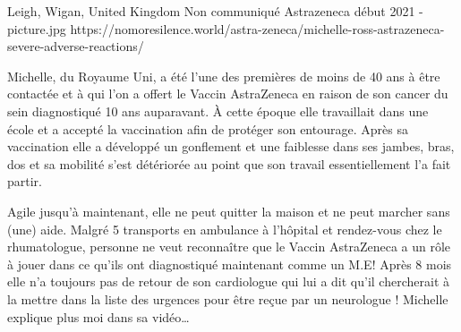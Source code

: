 {Leigh, Wigan, United Kingdom}
{Non communiqué}
{Astrazeneca}
{début 2021}
{-}
{picture.jpg}
{https://nomoresilence.world/astra-zeneca/michelle-ross-astrazeneca-severe-adverse-reactions/}
{

Michelle, du Royaume Uni, a été l’une des premières de moins de 40 ans à être
contactée et à qui l’on a offert le Vaccin AstraZeneca en raison de son cancer
du sein diagnostiqué 10 ans auparavant. À cette époque elle travaillait dans une
école et a accepté la vaccination afin de protéger son entourage. Après sa
vaccination elle a développé un gonflement et une faiblesse dans ses jambes,
bras, dos et sa mobilité s’est détériorée au point que son travail
essentiellement l’a fait partir.

Agile jusqu’à maintenant, elle ne peut quitter la maison et ne peut marcher sans
(une) aide. Malgré 5 transports en ambulance à l’hôpital et rendez-vous chez le
rhumatologue, personne ne veut reconnaître que le Vaccin AstraZeneca a un rôle à
jouer dans ce qu’ils ont diagnostiqué maintenant comme un M.E! Après 8 mois elle
n’a toujours pas de retour de son cardiologue qui lui a dit qu’il chercherait à
la mettre dans la liste des urgences pour être reçue par un neurologue !
Michelle explique plus moi dans sa vidéo…

}
